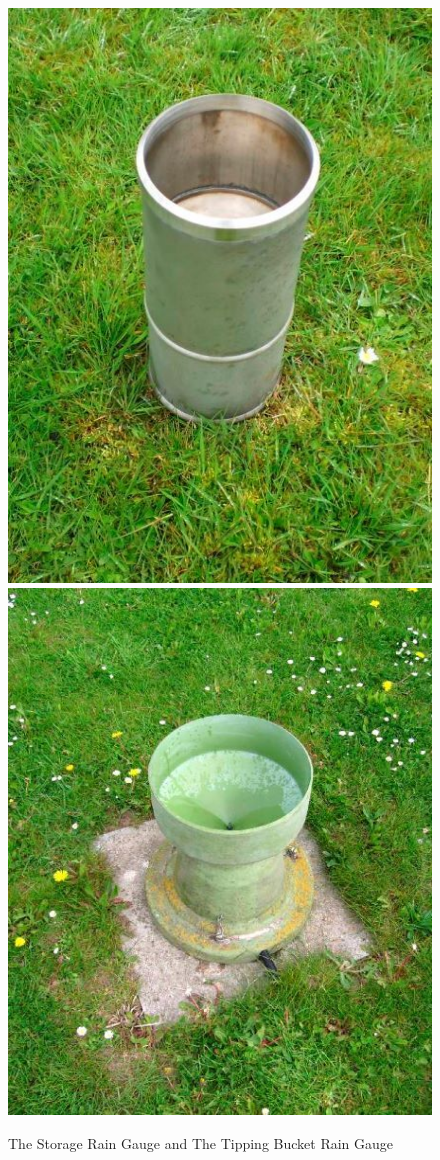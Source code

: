 \begin{figure}[h]
\centering
\includegraphics[scale=0.2]{img/storageRainGauge.jpg}
\includegraphics[scale=0.2]{img/tippingBucketGauge.jpg}
\caption{The Storage Rain Gauge and The Tipping Bucket Rain Gauge}
\label{Gauge}
\end{figure}

